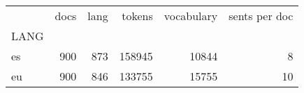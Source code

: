 \begin{tabular}{lrrrrr}
\toprule
 & docs & lang & tokens & vocabulary & sents per doc \\
LANG &  &  &  &  &  \\
\midrule
es & 900 & 873 & 158945 & 10844 & 8 \\
eu & 900 & 846 & 133755 & 15755 & 10 \\
\bottomrule
\end{tabular}
